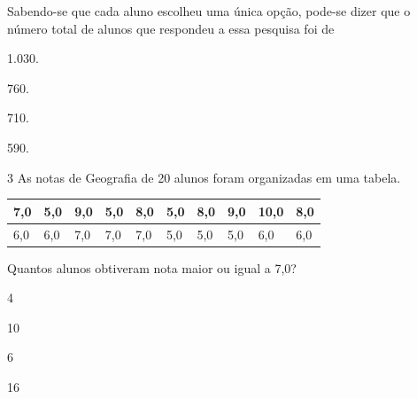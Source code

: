 Sabendo-se que cada aluno escolheu uma única opção, pode-se dizer que o
número total de alunos que respondeu a essa pesquisa foi de

\begin{escolha}
\item
  1.030.
\item
  760.
\item
  710.
\item
  590.
\end{escolha}

\num{3} As notas de Geografia de 20 alunos foram organizadas em uma tabela.

\begin{longtable}[]{@{}llllllllll@{}}
\toprule
7,0 & 5,0 & 9,0 & 5,0 & 8,0 & 5,0 & 8,0 & 9,0 & 10,0 &
8,0\tabularnewline
\midrule
\endhead
6,0 & 6,0 & 7,0 & 7,0 & 7,0 & 5,0 & 5,0 & 5,0 & 6,0 & 6,0\tabularnewline
\bottomrule
\end{longtable}

Quantos alunos obtiveram nota maior ou igual a 7,0?

\begin{multicols}{2}
\begin{escolha}
\item
  4
\item
  10
\item
  6
\item
  16
\end{escolha}
\end{multicols}

